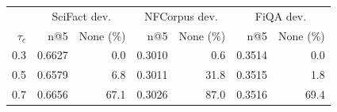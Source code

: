 \begin{tabular}{rrrrrrr}
\toprule
& \multicolumn{2}{c}{SciFact dev.} & \multicolumn{2}{c}{NFCorpus dev.} & \multicolumn{2}{c}{FiQA dev.}\\
$\tau_c$ & n@5 & None (\%) & n@5 & None (\%) & n@5 & None (\%)\\
\midrule
0.3 & 0.6627 & 0.0 & 0.3010 & 0.6 & 0.3514 & 0.0\\
0.5 & 0.6579 & 6.8 & 0.3011 & 31.8 & 0.3515 & 1.8\\
0.7 & 0.6656 & 67.1 & 0.3026 & 87.0 & 0.3516 & 69.4\\
\bottomrule
\end{tabular}
